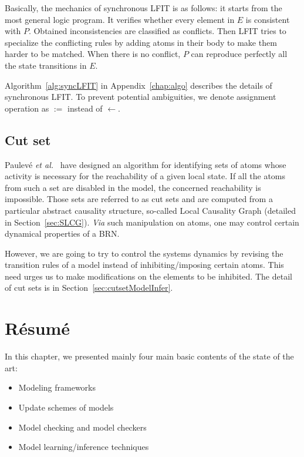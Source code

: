Basically, the mechanics of synchronous LFIT is as follows: it starts from the most general logic program.
It verifies whether every element in $E$ is consistent with $P$.
Obtained inconsistencies are classified as conflicts.
Then LFIT tries to specialize the conflicting rules by adding atoms in their body to make them harder to be matched.
When there is no conflict, $P$ can reproduce perfectly all the state transitions in $E$.

Algorithm~\ref{alg:syncLFIT} in Appendix~\ref{chap:algo} describes the details of synchronous LFIT.
To prevent potential ambiguities, we denote assignment operation as $:=$ instead of $\gets$. 


\subsection{Cut set}\label{sec:cutset}

Paulev\'e \textit{et al.}~\cite{PAK13-CAV} have designed an algorithm for identifying sets of atoms whose activity is necessary for the reachability of a given local state. 
If all the atoms from such a set are disabled in the model, the concerned reachability is impossible. 
Those sets are referred to as cut sets and are computed from a particular abstract causality structure, so-called Local Causality Graph (detailed in Section~\ref{sec:SLCG}).
\textit{Via} such manipulation on atoms, one may control certain dynamical properties of a BRN.

However, we are going to try to control the systems dynamics by revising the transition rules of a model instead of inhibiting/imposing certain atoms.
This need urges us to make modifications on the elements to be inhibited.
The detail of cut sets is in Section~\ref{sec:cutsetModelInfer}. 

\section{R\'esum\'e}
In this chapter, we presented mainly four main basic contents of the state of the art:

\begin{itemize}
    \item Modeling frameworks
    \item Update schemes of models
    \item Model checking and model checkers
    \item Model learning/inference techniques
\end{itemize}

